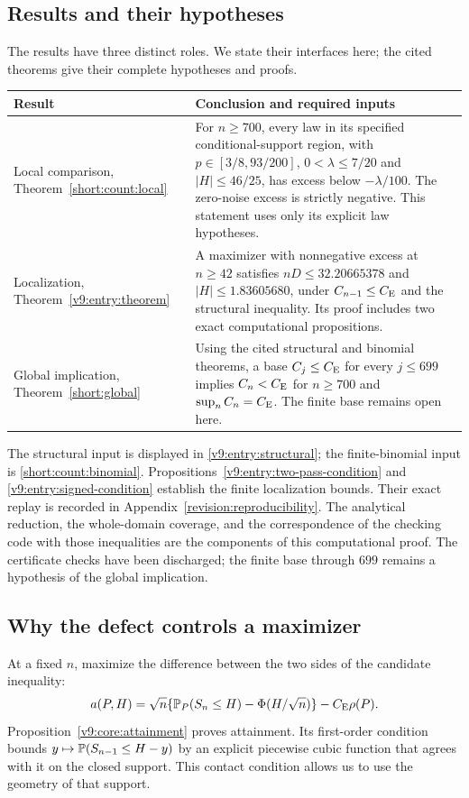 \subsection{Results and their hypotheses}\label{ms:scope}
The results have three distinct roles. We state their interfaces here;
the cited theorems give their complete hypotheses and proofs.
\begin{center}\small
\begin{tabular}{@{}P{.25\linewidth}P{.68\linewidth}@{}}
\toprule
Result & Conclusion and required inputs \\
\midrule
Local comparison, Theorem~\ref{short:count:local} &
For $n\ge700$, every law in its specified conditional-support region,
with $p\in[3/8,93/200]$, $0<\lambda\le7/20$ and $|H|\le46/25$,
has excess below $-\lambda/100$. The zero-noise excess is strictly
negative. This statement uses only its explicit law hypotheses. \\
Localization, Theorem~\ref{v9:entry:theorem} &
A maximizer with nonnegative excess at $n\ge42$ satisfies
$nD\le32.20665378$ and $|H|\le1.83605680$, under
$C_{n-1}\le C_{\mathrm E}$ and the structural inequality. Its proof includes
two exact computational propositions. \\
Global implication, Theorem~\ref{short:global} &
Using the cited structural and binomial theorems,
a base $C_j\le C_{\mathrm E}$ for every $j\le699$ implies $C_n<C_{\mathrm E}$ for
$n\ge700$ and $\sup_n C_n=C_{\mathrm E}$. The finite base remains open here. \\
\bottomrule
\end{tabular}
\end{center}
The structural input is displayed in \eqref{v9:entry:structural}; the
finite-binomial input is \eqref{short:count:binomial}.
Propositions~\ref{v9:entry:two-pass-condition} and
\ref{v9:entry:signed-condition} establish the finite localization
bounds. Their exact replay is recorded in Appendix~\ref{revision:reproducibility}.
The analytical reduction, the whole-domain coverage, and the
correspondence of the checking code with those inequalities are the
components of this computational proof. The certificate checks have
been discharged; the finite base through $699$ remains a hypothesis
of the global implication.

\subsection{Why the defect controls a maximizer}
At a fixed $n$, maximize the difference between the two sides of the
candidate inequality:
\begin{equation}\label{v9:intro:excess}
 a(P,H)=\sqrt n\{\mathbb P_P(S_n\le H)-\Phi(H/\sqrt n)\}-C_{\mathrm E}\rho(P).
\end{equation}
Proposition~\ref{v9:core:attainment} proves attainment. Its first-order
condition bounds $y\mapsto\mathbb P(S_{n-1}\le H-y)$ by an explicit
piecewise cubic function that agrees with it on the closed support.
This contact condition allows us to use the geometry of that support.

